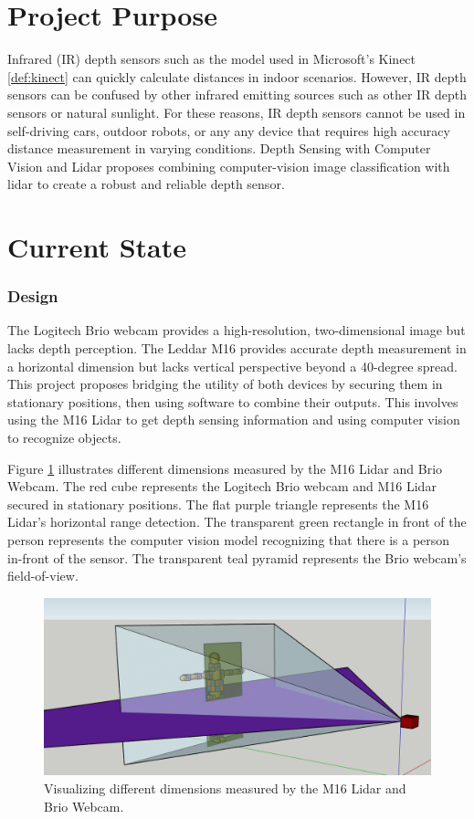 \documentclass[onecolumn, draftclsnofoot,10pt, compsoc]{IEEEtran}
\makeatletter
\newcommand\captionof[1]{\def\@captype{#1}\caption}
\makeatother
\begin{document}
\begin{singlespace}
		
	\section{Project Purpose}
		Infrared (IR) depth sensors such as the model used in Microsoft's Kinect \ref{def:kinect} can quickly calculate distances in indoor scenarios.
		However, IR depth sensors can be confused by other infrared emitting sources such as other IR depth sensors or natural sunlight.
		For these reasons, IR depth sensors cannot be used in self-driving cars, outdoor robots, or any any device that requires high accuracy distance measurement in varying conditions.
		Depth Sensing with Computer Vision and Lidar proposes combining computer-vision image classification with lidar to create a robust and reliable depth sensor.

	\section{Current State}

		\subsubsection{Design}
			The Logitech Brio webcam provides a high-resolution, two-dimensional image but lacks depth perception.
			The Leddar M16 provides accurate depth measurement in a horizontal dimension but lacks vertical perspective beyond a 40-degree spread.
			This project proposes bridging the utility of both devices by securing them in stationary positions, then using software to combine their outputs.
			This involves using the M16 Lidar to get depth sensing information and using computer vision to recognize objects.			


			Figure \ref{dimensions} illustrates different dimensions measured by the M16 Lidar and Brio Webcam.
			The red cube represents the Logitech Brio webcam and M16 Lidar secured in stationary positions.
			The flat purple triangle represents the M16 Lidar's horizontal range detection.
			The transparent green rectangle in front of the person represents the computer vision model recognizing that there is a person in-front of the sensor.
			The transparent teal pyramid represents the Brio webcam's field-of-view.
			
			\begin{figure}[H]
				\includegraphics[scale=0.5]{different_dimensions.PNG}
				\captionof{figure}{Visualizing different dimensions measured by the M16 Lidar and Brio Webcam.}
				\label{dimensions}
			\end{figure}



\end{singlespace}
\end{document}
